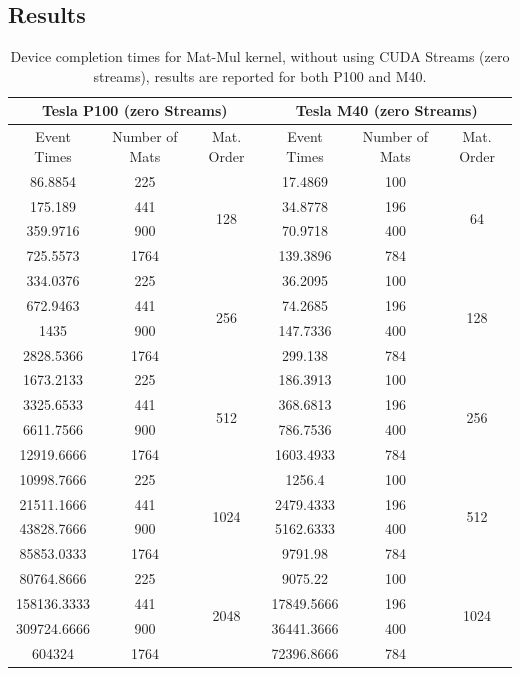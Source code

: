 \subsection{Results}
\begin{table}	
	\centering
	\begin{tabular}{ | c c c  | c c c | } 
		\hline
		\multicolumn{3}{c}{\textbf{Tesla P100 (zero Streams)}} & \multicolumn{3}{c}{\textbf{Tesla M40 (zero Streams)}}\\ [0.5ex]
		\hline\hline
		Event Times  & Number of Mats & Mat. Order & Event Times  & Number of Mats & Mat. Order  \\
		\hline
		
		
		86.8854&	225&	\multirow{4}{*}{128}&	17.4869&	100&	\multirow{4}{*}{64}\\
		175.189&	441&	&	34.8778&	196&	\\
		359.9716&	900&	&	70.9718&	400&	\\
		725.5573&	1764&	&	139.3896&	784&	\\
		\hline
		334.0376&	225&	\multirow{4}{*}{256}&	36.2095&	100&	\multirow{4}{*}{128}\\
		672.9463&	441&	&	74.2685&	196&	\\
		1435&	900&	&	147.7336&	400&	\\
		2828.5366&	1764&	&	299.138&	784&	\\
		\hline
		1673.2133&	225&	\multirow{4}{*}{512}&	186.3913&	100&	\multirow{4}{*}{256}\\
		3325.6533&	441&	&	368.6813&	196&	\\
		6611.7566&	900&	&	786.7536&	400&	\\
		12919.6666&	1764&	&	1603.4933&	784& \\
		\hline
		10998.7666&	225&	\multirow{4}{*}{1024}&	1256.4&	100&	\multirow{4}{*}{512}\\
		21511.1666&	441&	&	2479.4333&	196&	\\
		43828.7666&	900&	&	5162.6333&	400&	\\
		85853.0333&	1764&	&	9791.98&	784&	\\
		\hline
		80764.8666&	225&	\multirow{4}{*}{2048}&	9075.22&	100&	\multirow{4}{*}{1024}\\
		158136.3333& 441&	&	17849.5666&	196&	\\
		309724.6666& 900&	&	36441.3666&	400&	\\
		604324&	1764&	&	72396.8666&	784&	\\
		
		\hline
		
	\end{tabular}
	\caption{Device completion times for Mat-Mul kernel, without using CUDA Streams (zero streams), results are reported for both P100 and M40.}	
	\label{tab:matvgszero}		
\end{table}

